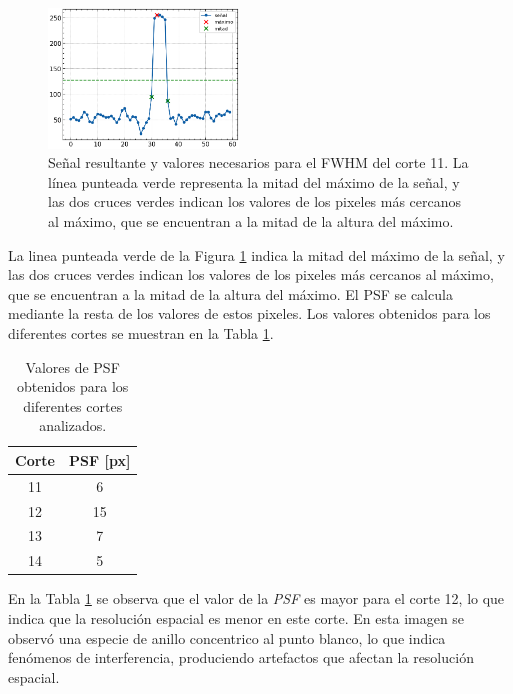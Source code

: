 \documentclass[11pt, twocolumn]{article}
\begin{document}
\begin{figure}[htbp]
  \centering
  \includegraphics[width=0.45\textwidth]{images/ej_7/PSF.png}
  \caption{Señal resultante y valores necesarios para el FWHM del corte 11. La línea punteada verde representa la mitad del máximo de la señal, y las dos cruces verdes indican los valores de los pixeles más cercanos al máximo, que se encuentran a la mitad de la altura del máximo.}
  \label{fig:PSF}
\end{figure}

La linea punteada verde de la Figura \ref{fig:PSF} indica la mitad del máximo de la señal, y las dos cruces verdes indican los valores de los pixeles más cercanos al máximo, que se encuentran a la mitad de la altura del máximo. El PSF se calcula mediante la resta de los valores de estos pixeles. Los valores obtenidos para los diferentes cortes se muestran en la Tabla \ref{tab:PSF}.

\begin{table}[H]
  \centering
  \begin{tabular}{|c|c|}
  \hline
  \textbf{Corte} & \textbf{PSF [px]} \\ \hline
  11             & 6           \\ \hline
  12             & 15           \\ \hline
  13             & 7           \\ \hline
  14             & 5           \\ \hline
  \end{tabular}
  \caption{Valores de PSF obtenidos para los diferentes cortes analizados.}
  \label{tab:PSF}
\end{table}

En la Tabla \ref{tab:PSF} se observa que el valor de la \textit{PSF} es mayor para el corte 12, lo que indica que la resolución espacial es menor en este corte. En esta imagen se observó una especie de anillo concentrico al punto blanco, lo que indica fenómenos de interferencia, produciendo artefactos que afectan la resolución espacial.


\end{document}
